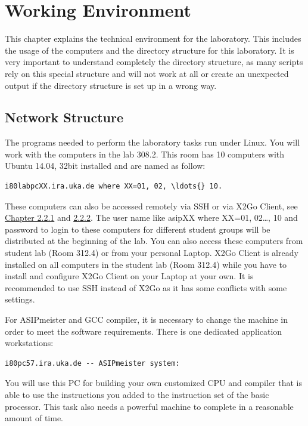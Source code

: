 \hypertarget{working-environment}{%
\chapter{Working Environment}\label{working-environment}}
This chapter explains the technical environment for the laboratory. This
includes the usage of the computers and the directory structure for this
laboratory. It is very important to understand completely the directory
structure, as many scripts rely on this special structure and will not
work at all or create an unexpected output if the directory structure is
set up in a wrong way.
\hypertarget{network-structure}{%
\section{Network Structure}\label{network-structure}}
The programs needed to perform the laboratory tasks run under Linux. You
will work with the computers in the lab 308.2. This room has 10
computers with Ubuntu 14.04, 32bit installed and are named as follow:
\begin{lstlisting}
i80labpcXX.ira.uka.de where XX=01, 02, \ldots{} 10.
\end{lstlisting}
These computers can also be accessed remotely via SSH or via X2Go
Client, see \protect\hyperlink{remote-operation}{Chapter 2.2.1} and
\protect\hyperlink{x2go-client}{2.2.2}. The user name like asipXX where
XX=01, 02\ldots, 10 and password to login to these computers for
different student groups will be distributed at the beginning of the
lab. You can also access these computers from student lab (Room 312.4)
or from your personal Laptop. X2Go Client is already installed on all
computers in the student lab (Room 312.4) while you have to install and
configure X2Go Client on your Laptop at your own. It is recommended to
use SSH instead of X2Go as it has some conflicts with some settings.

For ASIPmeister and GCC compiler, it is necessary to change the machine
in order to meet the software requirements. There is one dedicated
application workstations:
\begin{lstlisting}
i80pc57.ira.uka.de -- ASIPmeister system:
\end{lstlisting}
You will use this PC for building your own customized CPU and compiler
that is able to use the instructions you added to the instruction set of
the basic processor. This task also needs a powerful machine to complete
in a reasonable amount of time.

